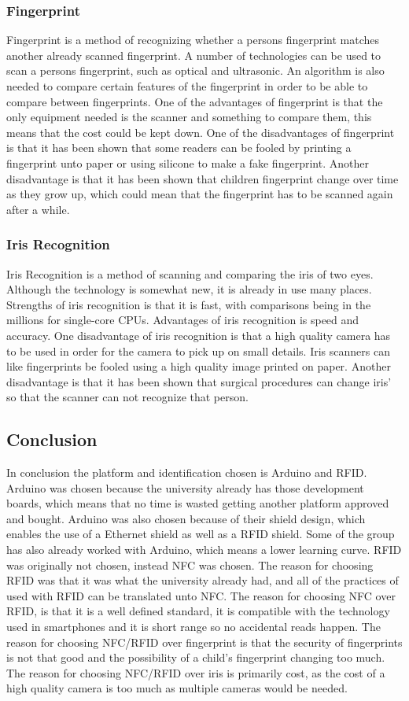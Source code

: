 \subsubsection{Fingerprint}
Fingerprint is a method of recognizing whether a persons fingerprint matches another already scanned fingerprint. A number of technologies can be used to scan a persons fingerprint, such as optical and ultrasonic. An algorithm is also needed to compare certain features of the fingerprint in order to be able to compare between fingerprints. One of the advantages of fingerprint is that the only equipment needed is the scanner and something to compare them, this means that the cost could be kept down. One of the disadvantages of fingerprint is that it has been shown that some readers can be fooled by printing a fingerprint unto paper or using silicone to make a fake fingerprint. Another disadvantage is that it has been shown that children fingerprint change over time as they grow up, which could mean that the fingerprint has to be scanned again after a while.

\subsubsection{Iris Recognition}
Iris Recognition is a method of scanning and comparing the iris of two eyes. Although the technology is somewhat new, it is already in use many places. Strengths of iris recognition is that it is fast, with comparisons being in the millions for single-core CPUs. Advantages of iris recognition is speed and accuracy. One disadvantage of iris recognition is that a high quality camera has to be used in order for the camera to pick up on small details. Iris scanners can like fingerprints be fooled using a high quality image printed on paper. Another disadvantage is that it has been shown that surgical procedures can change iris' so that the scanner can not recognize that person.

\subsection{Conclusion}
In conclusion the platform and identification chosen is Arduino and RFID. Arduino was chosen because the university already has those development boards, which means that no time is wasted getting another platform approved and bought. Arduino was also chosen because of their shield design, which enables the use of a Ethernet shield as well as a RFID shield. Some of the group has also already worked with Arduino, which means a lower learning curve. RFID was originally not chosen, instead NFC was chosen. The reason for choosing RFID was that it was what the university already had, and all of the practices of used with RFID can be translated unto NFC. The reason for choosing NFC over RFID, is that it is a well defined standard, it is compatible with the technology used in smartphones and it is short range so no accidental reads happen. The reason for choosing NFC/RFID over fingerprint is that the security of fingerprints is not that good and the possibility of a child's fingerprint changing too much. The reason for choosing NFC/RFID over iris is primarily cost, as the cost of a high quality camera is too much as multiple cameras would be needed.